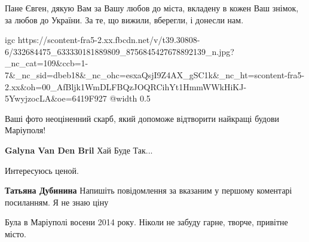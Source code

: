 
Пане Євген, дякую Вам за Вашу любов до міста, вкладену в кожен Ваш знімок, за
любов до України. За те, що вижили, вберегли, і донесли нам.


\ifcmt
  igc https://scontent-fra5-2.xx.fbcdn.net/v/t39.30808-6/332684475_633330181889809_8756845427678892139_n.jpg?_nc_cat=109&ccb=1-7&_nc_sid=dbeb18&_nc_ohc=esxaQsjI9Z4AX_gSC1k&_nc_ht=scontent-fra5-2.xx&oh=00_AfBljk1WmDLFBQzJOQRCihYt1HmmWWkHiKJ-5YwyjzocLA&oe=6419F927
	@width 0.5
\fi


Ваші фото неоціненний скарб, який допоможе відтворити найкращі будови Маріуполя!

\begin{itemize} %
\textbf{Galyna Van Den Bril} Хай Буде Так...
\end{itemize} %


Интересуюсь ценой.

\begin{itemize} %
\textbf{Татьяна Дубинина} Напишіть повідомлення за вказаним у першому коментарі посиланням. Я не знаю ціну
\end{itemize} %


Була в Маріуполі восени 2014 року. Ніколи не забуду гарне, творче, привітне місто.
